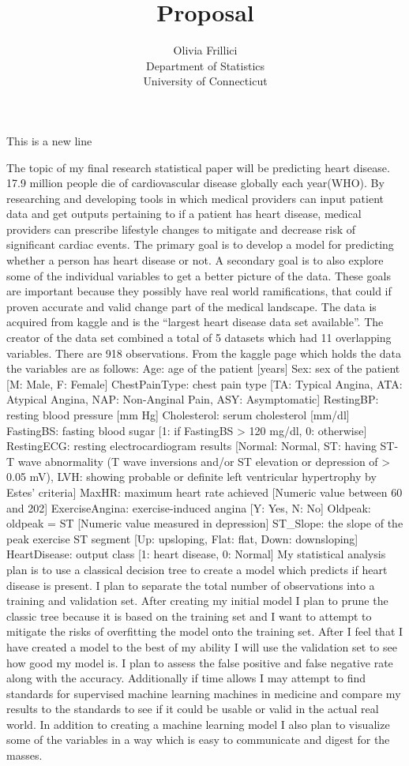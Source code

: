\documentclass[12pt]{article}
\title{Proposal}
\author{Olivia Frillici\\
  Department of Statistics\\
  University of Connecticut
}
\begin{document}
\maketitle


This is a new line

The topic of my final research statistical paper will be predicting heart disease. 17.9 million people die of cardiovascular disease globally each year(WHO). By researching and developing tools in which medical providers can input patient data and get outputs pertaining to if a patient has heart disease, medical providers can prescribe lifestyle changes to mitigate and decrease risk of significant cardiac events. 
The primary goal is to develop a model for predicting whether a person has heart disease or not. A secondary goal is to also explore some of the individual variables to get a better picture of the data. These goals are important because they possibly have real world ramifications, that could if proven accurate and valid change part of the medical landscape. 
The data is acquired from kaggle and is the “largest heart disease data set available”. The creator of the data set combined a total of 5 datasets which had 11 overlapping variables. There are 918 observations. From the kaggle page which holds the data the variables are as follows: 
Age: age of the patient [years]
Sex: sex of the patient [M: Male, F: Female]
ChestPainType: chest pain type [TA: Typical Angina, ATA: Atypical Angina, NAP: Non-Anginal Pain, ASY: Asymptomatic]
RestingBP: resting blood pressure [mm Hg]
Cholesterol: serum cholesterol [mm/dl]
FastingBS: fasting blood sugar [1: if FastingBS > 120 mg/dl, 0: otherwise]
RestingECG: resting electrocardiogram results [Normal: Normal, ST: having ST-T wave abnormality (T wave inversions and/or ST elevation or depression of > 0.05 mV), LVH: showing probable or definite left ventricular hypertrophy by Estes' criteria]
MaxHR: maximum heart rate achieved [Numeric value between 60 and 202]
ExerciseAngina: exercise-induced angina [Y: Yes, N: No]
Oldpeak: oldpeak = ST [Numeric value measured in depression]
ST\_Slope: the slope of the peak exercise ST segment [Up: upsloping, Flat: flat, Down: downsloping]
HeartDisease: output class [1: heart disease, 0: Normal]
My statistical analysis plan is to use a classical decision tree to create a model which predicts if heart disease is present. I plan to separate the total number of observations into a training and validation set. After creating my initial model I plan to prune the classic tree because it is based on the training set and I want to attempt to mitigate the risks of overfitting the model onto the training set. After I feel that I have created a model to the best of my ability I will use the validation set to see how good my model is. I plan to assess the false positive and false negative rate along with the accuracy. Additionally if time allows I may attempt to find standards for supervised machine learning machines in medicine and compare my results to the standards to see if it could be usable or valid in the actual real world. In addition to creating a machine learning model I also plan to visualize some of the variables in a way which is easy to communicate and digest for the masses. 
\end{document}
